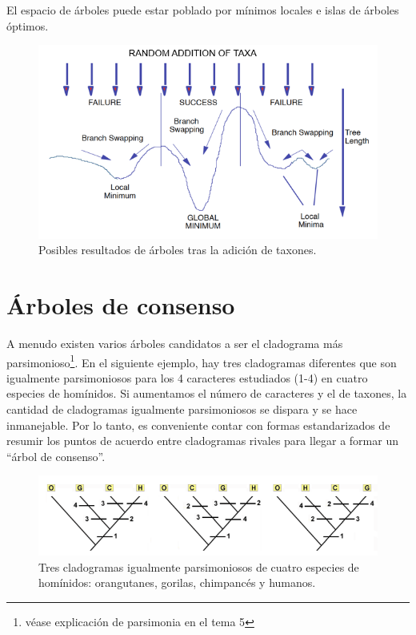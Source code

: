 El espacio de árboles puede estar poblado por mínimos locales e islas de árboles óptimos.

\begin{figure}[htbp]
\centering
\includegraphics[width=0.7\linewidth]{figs/result-swapping.png}
\caption{Posibles resultados de árboles tras la adición de taxones.}
\end{figure}

\section{Árboles de consenso}
A menudo existen varios árboles candidatos a ser el cladograma más parsimonioso\footnote{véase explicación de parsimonia en el tema 5}. En el siguiente ejemplo, hay tres cladogramas diferentes que son igualmente parsimoniosos para los 4 caracteres estudiados (1-4) en cuatro especies de homínidos. Si aumentamos el número de caracteres y el de taxones, la cantidad de cladogramas igualmente parsimoniosos se dispara y se hace inmanejable. Por lo tanto, es conveniente contar con formas estandarizados de resumir los puntos de acuerdo entre cladogramas rivales para llegar a formar un “árbol de consenso”.

\begin{figure}[htbp]
\centering
\includegraphics[width=0.7\linewidth]{figs/cladogramas-hominidos.png}
\caption{Tres cladogramas igualmente parsimoniosos de cuatro especies de homínidos: orangutanes, gorilas, chimpancés y humanos.}
\end{figure}

